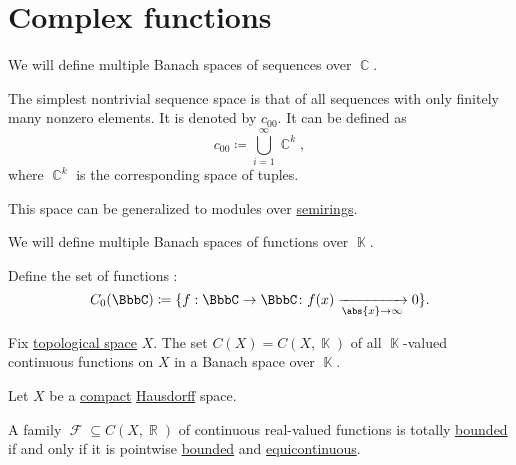 \section{Complex functions}\label{sec:complex_functions}

\begin{definition}\label{def:sequence_spaces}
  We will define multiple Banach spaces of sequences over \( \BbbC \).

  \begin{thmenum}
     The simplest nontrivial sequence space is that of all sequences with only finitely many nonzero elements. It is denoted by \( c_{00} \). It can be defined as
    \begin{equation*}
      c_{00} \coloneqq \bigcup_{i=1}^\infty \BbbC^k,
    \end{equation*}
    where \( \BbbC^k \) is the corresponding space of tuples.

    This space can be generalized to modules over \hyperref[def:module]{semirings}.
  \end{thmenum}
\end{definition}

\begin{definition}\label{def:function_spaces}
  We will define multiple Banach spaces of functions over \( \BbbK \).

  \begin{thmenum}
     Define the set of functions :
    \begin{equation*}
      C_0(\BbbC) \coloneqq \{ f: \BbbC \to \BbbC \colon f(x) \xrightarrow[\abs{x} \to \infty]{} 0 \}.
    \end{equation*}

     Fix \hyperref[def:topological_space]{topological space} \( X \). The set \( C(X) = C(X, \BbbK) \) of all \( \BbbK \)-valued continuous functions on \( X \) in a Banach space over \( \BbbK \).
  \end{thmenum}
\end{definition}

\begin{theorem}\label{thm:arzela_ascoli}
  Let \( X \) be a \hyperref[def:compact_space]{compact} \hyperref[def:separation_axioms/T2]{Hausdorff} space.

  A family \( \mscrF \subseteq C(X, \BbbR) \) of continuous real-valued functions is totally \hyperref[def:totally_bounded_set]{bounded} if and only if it is pointwise \hyperref[def:bounded_function/pointwise]{bounded} and \hyperref[def:function_set_continuity/equicontinuous]{equicontinuous}.
\end{theorem}
